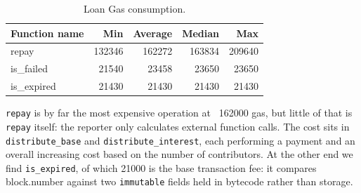 \begin{table}[ht]
	\centering
	\caption{Loan Gas consumption.}
	\label{tab:loan_gas}
	\begin{tabular}{lrrrr}
		\toprule
		\textbf{Function name} & \textbf{Min} & \textbf{Average} & \textbf{Median} & \textbf{Max} \\
		\midrule
		repay                & 132346 & 162272 & 163834 & 209640 \\
		is\_failed           & 21540  & 23458  & 23650  & 23650  \\
		is\_expired          & 21430  & 21430  & 21430  & 21430  \\
		\bottomrule
	\end{tabular}
\end{table}

\texttt{repay} is by far the most expensive operation at ~162000 gas, but little of that is \texttt{repay} itself: the reporter only calculates external function calls. The cost sits in \texttt{distribute\_base} and \texttt{distribute\_interest}, each performing a payment and an overall increasing cost based on the number of contributors. At the other end we find \texttt{is\_expired}, of which 21000 is the base transaction fee: it compares block.number against two \texttt{immutable} fields held in bytecode rather than storage.

